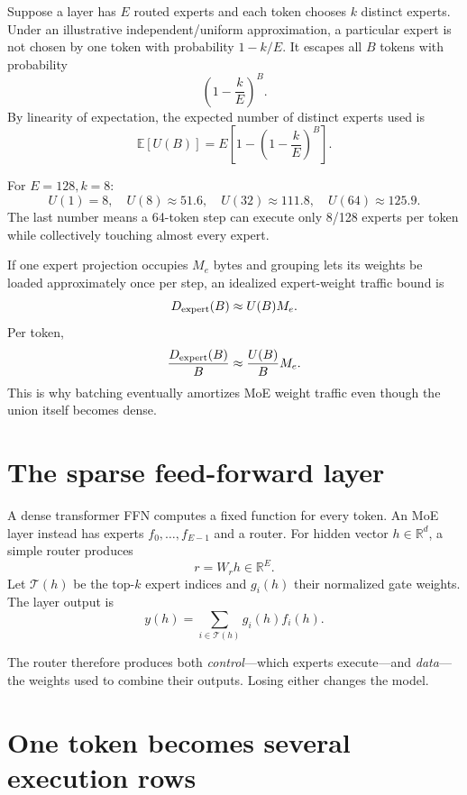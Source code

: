 
Suppose a layer has $E$ routed experts and each token chooses $k$ distinct experts.
Under an illustrative independent/uniform approximation, a particular expert is not
chosen by one token with probability $1-k/E$. It escapes all $B$ tokens with
probability
\[
\left(1-\frac{k}{E}\right)^B.
\]
By linearity of expectation, the expected number of distinct experts used is
\begin{equation}
\mathbb{E}[U(B)]
=E\left[1-\left(1-\frac{k}{E}\right)^B\right].
\label{eq:ch43-union}
\end{equation}

For $E=128,k=8$:
\[
U(1)=8,\quad U(8)\approx51.6,\quad U(32)\approx111.8,\quad
U(64)\approx125.9.
\]
The last number means a 64-token step can execute only 8/128 experts per token while
collectively touching almost every expert.

If one expert projection occupies $M_e$ bytes and grouping lets its weights be loaded
approximately once per step, an idealized expert-weight traffic bound is
\[
D_{\rm expert}(B)\approx U(B)M_e.
\]
Per token,
\[
\frac{D_{\rm expert}(B)}{B}\approx\frac{U(B)}{B}M_e.
\]
This is why batching eventually amortizes MoE weight traffic even though the union
itself becomes dense.

\section{The sparse feed-forward layer}

A dense transformer FFN computes a fixed function for every token. An MoE layer instead
has experts $f_0,\ldots,f_{E-1}$ and a router. For hidden vector
$h\in\mathbb{R}^{d}$, a simple router produces
\[
r=W_rh\in\mathbb{R}^{E}.
\]
Let $\mathcal{T}(h)$ be the top-$k$ expert indices and $g_i(h)$ their normalized gate
weights. The layer output is
\begin{equation}
y(h)=\sum_{i\in\mathcal{T}(h)}g_i(h)f_i(h).
\label{eq:ch43-moe}
\end{equation}

The router therefore produces both \emph{control}---which experts execute---and
\emph{data}---the weights used to combine their outputs. Losing either changes the
model.

\section{One token becomes several execution rows}

